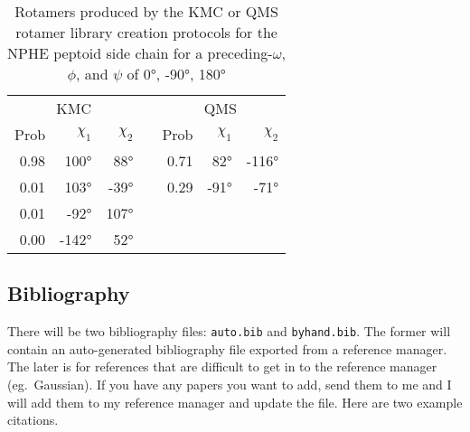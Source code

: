 \begin{table}
  \centering
  \caption{Rotamers produced by the KMC or QMS rotamer library creation protocols for the NPHE peptoid side chain for a preceding-$\omega$, $\phi$, and $\psi$ of \ang{0}, \ang{-90}, \ang{180}}
  \label{supptbl:rot_lib_snpshot_nmeo}
  \begin{tabular}{rrrcrrr}
    \toprule
    \multicolumn{3}{c}{KMC} && \multicolumn{3}{c}{QMS} \\
    \cmidrule{1-3} \cmidrule{5-7}
    Prob & $\chi_1$  & $\chi_2$ && Prob & $\chi_1$  & $\chi_2$ \\
    \midrule
    0.98 & \ang{100}  &  \ang{88}  && 0.71 & \ang{82}  &  \ang{-116} \\
    0.01 & \ang{103}  &  \ang{-39} && 0.29 & \ang{-91} &  \ang{-71}  \\
    0.01 & \ang{-92}  &  \ang{107} && ~ & ~ & ~ \\
    0.00 & \ang{-142} &  \ang{52}  && ~ & ~ & ~ \\
    \bottomrule
  \end{tabular}
\end{table}

\subsection{Bibliography}
There will be two bibliography files: \texttt{auto.bib} and \texttt{byhand.bib}.
The former will contain an auto-generated bibliography file exported from a reference manager.
The later is for references that are difficult to get in to the reference manager (eg.~Gaussian).
If you have any papers you want to add, send them to me and I will add them to my reference manager and update the file.
Here are two example citations\cite{jacak_computational_2012,renfrew_incorporation_2012}.
